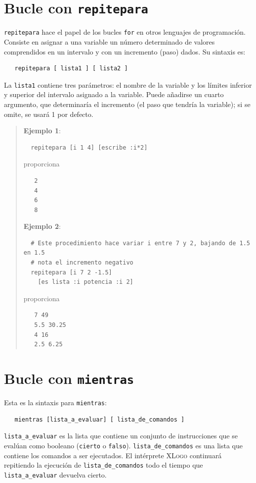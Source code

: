 \section{Bucle con \texttt{repitepara}}
   \label{Bucle-con-repitepara}

\texttt{repitepara} hace el papel de los bucles \texttt{for} en otros
lenguajes de programaci\'on. Consiste en asignar a una variable un n\'umero
determinado de valores comprendidos en un intervalo y con un incremento
(paso) dados. Su sintaxis es:
\begin{verbatim}
   repitepara [ lista1 ] [ lista2 ] \end{verbatim}
La \texttt{lista1} contiene tres par\'ametros: el nombre de la variable
y los l\'imites inferior y superior del intervalo asignado a la variable.
Puede a\~nadirse un cuarto argumento, que determinar\'ia el incremento
(el paso que tendr\'ia la variable); si se omite, se usar\'a 1 por defecto.
\begin{quote}
   \noindent \textbf{Ejemplo 1}:
   \begin{verbatim}
  repitepara [i 1 4] [escribe :i*2] \end{verbatim}
   proporciona
   \begin{verbatim}
   2
   4
   6
   8 \end{verbatim}

   \noindent \textbf{Ejemplo 2}:
   \begin{verbatim}
  # Este procedimiento hace variar i entre 7 y 2, bajando de 1.5 en 1.5
  # nota el incremento negativo
  repitepara [i 7 2 -1.5]
    [es lista :i potencia :i 2] \end{verbatim}
   proporciona
   \begin{verbatim}
   7 49
   5.5 30.25
   4 16
   2.5 6.25 \end{verbatim}
\end{quote}

\section{Bucle con \texttt{mientras}}
   \label{Bucle-con-mientras}

Esta es la sintaxis para \texttt{mientras}:
\begin{verbatim}
   mientras [lista_a_evaluar] [ lista_de_comandos ] \end{verbatim}
\texttt{lista\_a\_evaluar} es la lista que contiene un conjunto de
instrucciones que se eval\'uan como booleano (\texttt{cierto} o
\texttt{falso}). \texttt{lista\_de\_comandos} es una lista que contiene
los comandos a ser ejecutados. El int\'erprete \textsc{XLogo} continuar\'a
repitiendo la ejecuci\'on de \texttt{lista\_de\_comandos} todo el tiempo
que \texttt{lista\_a\_evaluar} devuelva cierto. \\

